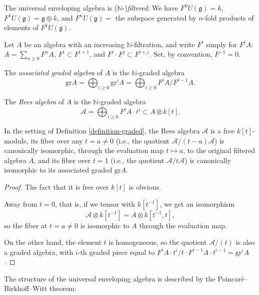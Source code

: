 The universal enveloping algebra is ($\mathbb N$-)\emph{filtered}: We have $F^0 U(\mathfrak g)= k$, $F^1 U(\mathfrak g) = \mathfrak g \oplus k$, and $F^n U(\mathfrak g) = $ the subspace generated by $n$-fold products of elements of $F^1 U(\mathfrak g)$.

\begin{definition}
 \label{definition-graded}
Let $A$ be an algebra with an increasing $\mathbb N$-filtration, and write $F^i$ simply for $F^i A$: $A=\sum_{n\ge 0} F^n A$, $F^i\subset F^{i+1}$, and $F^i \cdot F^j \subset F^{i+j}$. Set, by convention, $F^{-1}=0$.

The {\it associated graded algebra} of $A$ is the $\mathbb N$-graded algebra $$\text{gr} A = \bigoplus_{i\ge 0} \text{gr}^i A = \bigoplus_{i\ge 0} F^i A/ F^{i-1}A.$$ 

The {\it Rees algebra} of $A$ is the $\mathbb N$-graded algebra $$\mathcal A = \bigoplus_{i\ge 0} F^i A \cdot t^i \subset A\otimes k[t].$$

\end{definition}

\begin{lemma}
\label{lemma-Reesalgebra}
 In the setting of Definition \ref{definition-graded}, the Rees algebra $\mathcal A$ is a free $k[t]$-module, its fiber over any $t=a\ne 0$ (i.e., the quotient $\mathcal A/(t-a)\mathcal A$) is canonically isomorphic, through the evaluation map $t\mapsto a$, to the original filtered algebra $A$, and its fiber over $t=1$ (i.e., the quotient $\mathcal A/t\mathcal A$) is canonically isomorphic to its associated graded $\text{gr} A$.
\end{lemma}

\begin{proof}
 The fact that it is free over $k[t]$ is obvious.
 
 Away from $t=0$, that is, if we tensor with $k[t^{-1}]$, we get an isomorphism 
 $$ \mathcal A\otimes k[t^{-1}] = A \otimes k[t^{-1}, t],$$
 so the fiber at $t=a\ne 0$ is isomorphic to $A$ through the evaluation map.
 
 On the other hand, the element $t$ is homogeneous, so the quotient $\mathcal A/(t)$ is also a graded algebra, with $i$-th graded piece equal to $F^i A \cdot t^i / t\cdot F^{i-1} A \cdot t^{i-1}= \text{gr}^i A$. 
 
\end{proof}


The structure of the universal enveloping algebra is described by the Poincar\'e--Birkhoff--Witt theorem:


